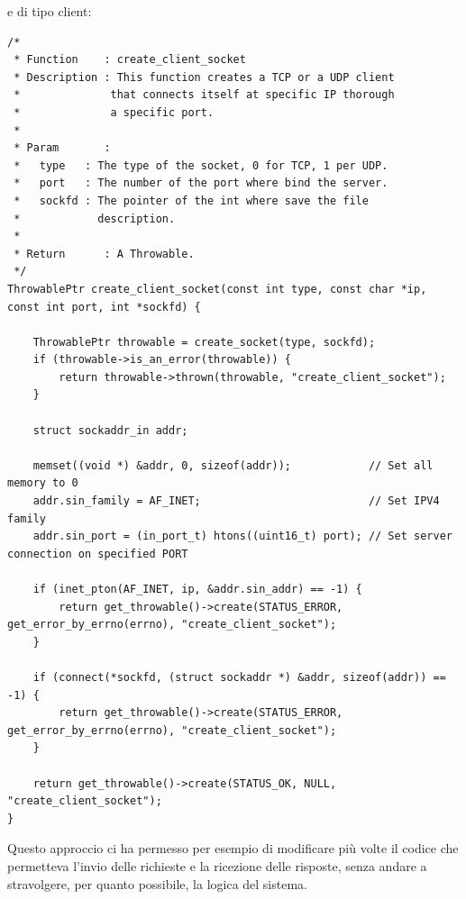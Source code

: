 \documentclass[italian]{tktltiki2}
\begin{document}
e di tipo client:
\begin{lstlisting}
/*
 * Function    : create_client_socket
 * Description : This function creates a TCP or a UDP client
 *              that connects itself at specific IP thorough
 *              a specific port.
 *
 * Param       :
 *   type   : The type of the socket, 0 for TCP, 1 per UDP.
 *   port   : The number of the port where bind the server.
 *   sockfd : The pointer of the int where save the file
 *            description.
 *
 * Return      : A Throwable.
 */
ThrowablePtr create_client_socket(const int type, const char *ip, const int port, int *sockfd) {

    ThrowablePtr throwable = create_socket(type, sockfd);
    if (throwable->is_an_error(throwable)) {
        return throwable->thrown(throwable, "create_client_socket");
    }

    struct sockaddr_in addr;

    memset((void *) &addr, 0, sizeof(addr));            // Set all memory to 0
    addr.sin_family = AF_INET;                          // Set IPV4 family
    addr.sin_port = (in_port_t) htons((uint16_t) port); // Set server connection on specified PORT

    if (inet_pton(AF_INET, ip, &addr.sin_addr) == -1) {
        return get_throwable()->create(STATUS_ERROR, get_error_by_errno(errno), "create_client_socket");
    }

    if (connect(*sockfd, (struct sockaddr *) &addr, sizeof(addr)) == -1) {
        return get_throwable()->create(STATUS_ERROR, get_error_by_errno(errno), "create_client_socket");
    }

    return get_throwable()->create(STATUS_OK, NULL, "create_client_socket");
}
\end{lstlisting}
Questo approccio ci ha permesso per esempio di modificare più volte il codice che permetteva l'invio delle richieste e la ricezione delle risposte, senza andare a stravolgere, per quanto possibile, la logica del sistema.
\end{document}
